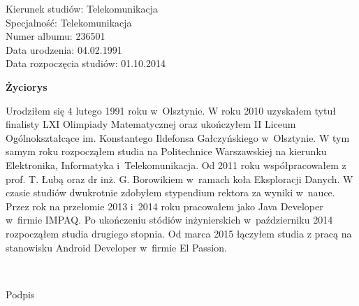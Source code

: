 	\newpage
	\thispagestyle{empty}

\begin{flushright}

  \begin{varwidth}[t]{\textwidth}
	Kierunek studiów: Telekomunikacja\\
	Specjalność: Telekomunikacja \\
	Numer albumu: 236501\\
	Data urodzenia: 04.02.1991 \\
	Data rozpoczęcia studiów: 01.10.2014 \\
  \end{varwidth}

\end{flushright}

\begin{center}
    \textbf{\textbf{Życiorys}}
\end{center}

	\vspace{0.5cm}

Urodziłem się 4 lutego 1991 roku w~Olsztynie.
W roku 2010 uzyskałem tytuł finalisty LXI Olimpiady Matematycznej oraz
ukończyłem II Liceum Ogólnokształcące im. Konstantego Ildefonsa Gałczyńskiego w~Olsztynie.
W tym samym roku rozpocząłem studia na Politechnice Warszawskiej na kierunku Elektronika, Informatyka i~Telekomunikacja.
Od 2011 roku współpracowałem z prof. T. Łubą oraz dr inż. G. Borowikiem w~ramach koła Eksploracji Danych.
W czasie studiów dwukrotnie zdobyłem stypendium rektora za wyniki w~nauce.
Przez rok na przełomie 2013 i~2014 roku pracowałem jako Java Developer w~firmie IMPAQ.
Po ukończeniu stódiów inżynierskich w~październiku 2014 rozpocząłem studia drugiego stopnia.
Od marca 2015 łączyłem studia z pracą na stanowisku Android Developer w~firmie El Passion.

	\vspace{1cm}

\begin{flushright}
	\begin{minipage}{5cm}
		\dotfill \\[-0.7cm]
		\begin{center}
		\small Podpis
		\end{center}
	\end{minipage}
\end{flushright}

	\vspace{2cm}
